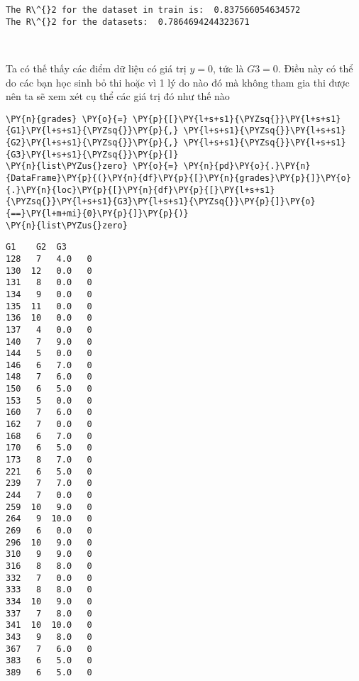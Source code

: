     \begin{Verbatim}[commandchars=\\\{\}]
The R\^{}2 for the dataset in train is:  0.837566054634572
The R\^{}2 for the datasets:  0.7864694244323671
    \end{Verbatim}

    \begin{center}
    \end{center}
    { \hspace*{\fill} \\}
    
    Ta có thế thấy các điểm dữ liệu có giá trị \(y=0\), tức là \(G3 = 0\).
Điều này có thể do các bạn học sinh bỏ thi hoặc vì 1 lý do nào đó mà
không tham gia thi được nên ta sẽ xem xét cụ thể các giá trị đó như thế
nào

    \begin{tcolorbox}[breakable, size=fbox, boxrule=1pt, pad at break*=1mm,colback=cellbackground, colframe=cellborder]
\begin{Verbatim}[commandchars=\\\{\}]
\PY{n}{grades} \PY{o}{=} \PY{p}{[}\PY{l+s+s1}{\PYZsq{}}\PY{l+s+s1}{G1}\PY{l+s+s1}{\PYZsq{}}\PY{p}{,} \PY{l+s+s1}{\PYZsq{}}\PY{l+s+s1}{G2}\PY{l+s+s1}{\PYZsq{}}\PY{p}{,} \PY{l+s+s1}{\PYZsq{}}\PY{l+s+s1}{G3}\PY{l+s+s1}{\PYZsq{}}\PY{p}{]}
\PY{n}{list\PYZus{}zero} \PY{o}{=} \PY{n}{pd}\PY{o}{.}\PY{n}{DataFrame}\PY{p}{(}\PY{n}{df}\PY{p}{[}\PY{n}{grades}\PY{p}{]}\PY{o}{.}\PY{n}{loc}\PY{p}{[}\PY{n}{df}\PY{p}{[}\PY{l+s+s1}{\PYZsq{}}\PY{l+s+s1}{G3}\PY{l+s+s1}{\PYZsq{}}\PY{p}{]}\PY{o}{==}\PY{l+m+mi}{0}\PY{p}{]}\PY{p}{)}
\PY{n}{list\PYZus{}zero}
\end{Verbatim}
\end{tcolorbox}

            \begin{tcolorbox}[breakable, size=fbox, boxrule=.5pt, pad at break*=1mm, opacityfill=0]
\begin{Verbatim}[commandchars=\\\{\}]
     G1    G2  G3
128   7   4.0   0
130  12   0.0   0
131   8   0.0   0
134   9   0.0   0
135  11   0.0   0
136  10   0.0   0
137   4   0.0   0
140   7   9.0   0
144   5   0.0   0
146   6   7.0   0
148   7   6.0   0
150   6   5.0   0
153   5   0.0   0
160   7   6.0   0
162   7   0.0   0
168   6   7.0   0
170   6   5.0   0
173   8   7.0   0
221   6   5.0   0
239   7   7.0   0
244   7   0.0   0
259  10   9.0   0
264   9  10.0   0
269   6   0.0   0
296  10   9.0   0
310   9   9.0   0
316   8   8.0   0
332   7   0.0   0
333   8   8.0   0
334  10   9.0   0
337   7   8.0   0
341  10  10.0   0
343   9   8.0   0
367   7   6.0   0
383   6   5.0   0
389   6   5.0   0
\end{Verbatim}
\end{tcolorbox}
        
